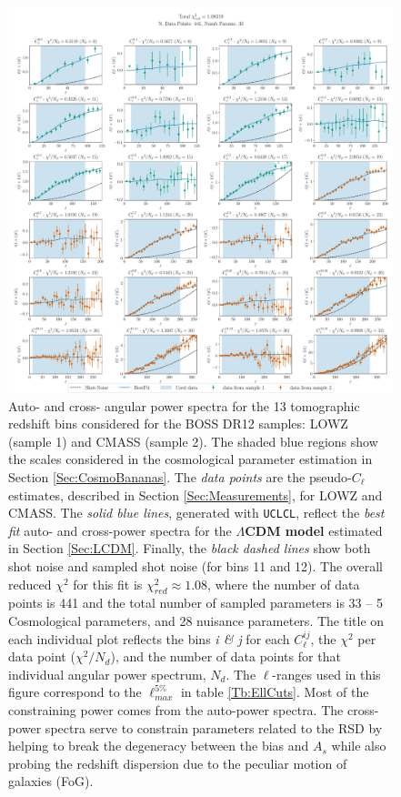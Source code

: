 \begin{figure}
\begin{center}
\includegraphics[width=1.05\columnwidth]{BOSS-FIGS/BestFit_LCDM.pdf}
\caption[BOSS measured $C_{\ell}$s and the best-fit theory from the $\Lambda$CDM model.]{Auto- and cross- angular power spectra for the 13 tomographic redshift bins considered for the BOSS DR12 samples: LOWZ (sample 1) and CMASS (sample 2). The shaded blue regions show the scales considered in the cosmological parameter estimation in Section \ref{Sec:CosmoBananas}. The \textit{data points} are the pseudo-$C_{\ell}$ estimates, described in Section \ref{Sec:Measurements}, for LOWZ and CMASS. The \textit{solid blue lines}, generated with \texttt{UCLCL}, reflect the \textit{best fit} auto- and cross-power spectra for the \textbf{$\Lambda$CDM model} estimated in Section \ref{Sec:LCDM}. Finally, the \textit{black dashed lines} show both shot noise and sampled shot noise (for bins 11 and 12). The overall reduced $\chi^2$ for this fit is $\chi^2_{red} \approx 1.08$, where the number of data points is 441 and the total number of sampled parameters is 33 -- 5 Cosmological parameters, and 28 nuisance parameters. The title on each individual plot reflects the bins \textit{i \& j} for each $C^{ij}_{\ell}$, the $\chi^2$ per data point ($\chi^2/N_d$), and the number of data points for that individual angular power spectrum, $N_d$. The $\ell$-ranges used in this figure correspond to the $\ell_{max}^{5\%}$ in table \ref{Tb:EllCuts}. Most of the constraining power comes from the auto-power spectra. The cross-power spectra serve to constrain parameters related to the RSD by helping to break the degeneracy between the bias and $A_s$ while also probing the redshift dispersion due to the peculiar motion of galaxies (FoG).}
\label{fig:Cl_Bestfit}
\end{center}
\end{figure}


